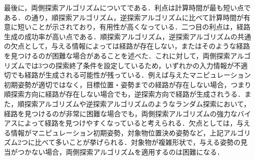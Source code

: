 \documentclass[a4paper,twoside,12pt,papersize, dvipdfmx]{iirthesis}
\begin{document}
最後に，両側探索アルゴリズムについてである．利点は計算時間が最も短い点である．の通り，順探索アルゴリズム，逆探索アルゴリズムに比べて計算時間が有意に短いことが示されており，有用性が高くなっている．二つ目の利点は，経路生成の成功率が高い点である．順探索アルゴリズム，逆探索アルゴリズムの共通の欠点として，与える情報によっては経路が存在しない，またはそのような経路を見つけるのが困難な場合があることを述べた．これに対して，両側探索アルゴリズムでは3つの探索終了条件を設定しているため，いずれかの入力情報が不適切でも経路が生成される可能性が残っている．例えば与えたマニピュレーション初期姿勢が適切ではなく，目標位置・姿勢までの経路が存在しない場合，つまり順探索方向に経路が存在しない場合でも，逆探索方向で経路が生成されうる．また，順探索アルゴリズムや逆探索アルゴリズムのようなランダム探索において，経路を見つけるのが非常に困難な場合でも，両側探索アルゴリズムの強力なバイアスによって経路を見つけやすくなっていると考えられる．欠点としては，与える情報がマニピュレーション初期姿勢，対象物位置決め姿勢など，上記アルゴリズム2つに比べて多いことが挙げられる．対象物が複雑形状で，与える姿勢の見当がつかない場合，両側探索アルゴリズムを適用するのは困難になる．\par
\end{document}
